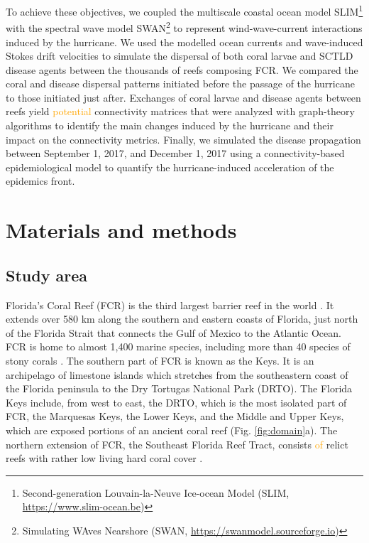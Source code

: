 \documentclass[fleqn,10pt]{wlscirep}
\newcommand{\modif}[1]{\textcolor{orange}{#1}}
\begin{document}
To achieve these objectives, we coupled the multiscale coastal ocean model SLIM\footnote{Second-generation Louvain-la-Neuve Ice-ocean Model (SLIM, \href{https://www.slim-ocean.be}{https://www.slim-ocean.be})} \citep{Lambrechts2008,Frys2020} with the spectral wave model SWAN\footnote{Simulating WAves Nearshore (SWAN, \href{https://swanmodel.sourceforge.io}{https://swanmodel.sourceforge.io})} \citep{Booij1999Apr,DobbyIrma} to represent wind-wave-current interactions induced by the hurricane. We used the modelled ocean currents and wave-induced Stokes drift velocities to simulate the dispersal of both coral larvae and SCTLD disease agents between the thousands of reefs composing FCR. We compared the coral and disease dispersal patterns initiated before the passage of the hurricane to those initiated just after. Exchanges of coral larvae and disease agents between reefs yield \modif{potential} connectivity matrices that were analyzed with graph-theory algorithms to identify the main changes induced by the hurricane and their impact on the connectivity metrics. Finally, we simulated the disease propagation between September 1, 2017, and December 1, 2017 using a connectivity-based epidemiological model \citep{DobbySCTLD} to quantify the hurricane-induced acceleration of the epidemics front.


\section{Materials and methods}
\subsection{Study area}
Florida's Coral Reef (FCR) is the third largest barrier reef in the world \citep{Finkl2008Jul}. It extends over 580 km along the southern and eastern coasts of Florida, just north of the Florida Strait that connects the Gulf of Mexico to the Atlantic Ocean. FCR is home to almost 1,400 marine species, including more than 40 species of stony corals \citep{Banks2008}. The southern part of FCR is known as the Keys. It is an archipelago of limestone islands which stretches from the southeastern coast of the Florida peninsula to the Dry Tortugas National Park (DRTO). The Florida Keys include, from west to east, the DRTO, which is the most isolated part of FCR, the Marquesas Keys, the Lower Keys, and the Middle and Upper Keys, which are exposed portions of an ancient coral reef (Fig. \ref{fig:domain}a). The northern extension of FCR, the Southeast Florida Reef Tract, consists \modif{of} relict reefs with rather low living hard coral cover \citep{Hoffmeister1968Nov,Banks2008}.
\end{document}
